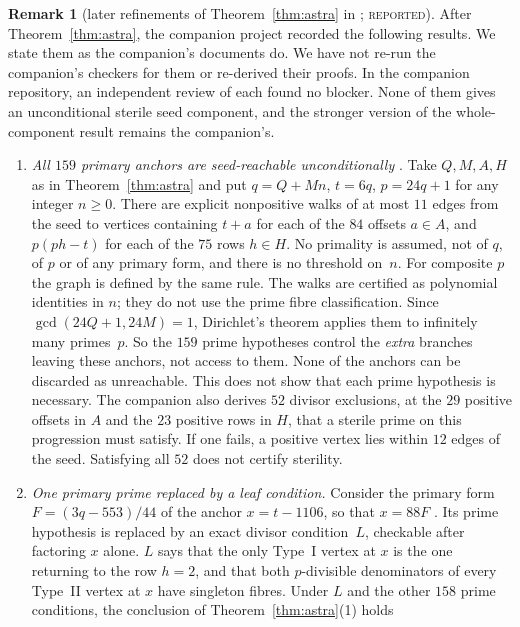 \documentclass[11pt,reqno]{amsart}
\theoremstyle{definition}
\newtheorem{remark}[theorem]{Remark}
\newcommand{\status}[1]{\textsc{#1}}
\begin{document}
\begin{remark}[later refinements of Theorem~\ref{thm:astra} in \cite{AS}; \status{reported}]\label{rem:astralater}
After Theorem~\ref{thm:astra}, the companion project recorded the
following results.  We state them as the companion's documents do.  We have
not re-run the companion's checkers for them or re-derived their proofs.
In the companion repository, an independent review of each found no
blocker.  None of them gives an unconditional sterile seed component, and
the stronger version of the whole-component result remains the
companion's.
\begin{enumerate}
\item \emph{All $159$ primary anchors are seed-reachable unconditionally}
\cite[\allowbreak\texttt{PRIMARY\_REACHABILITY.md}]{AS}.  Take $Q,M,A,H$ as in
Theorem~\ref{thm:astra} and put $q=Q+Mn$, $t=6q$, $p=24q+1$ for any integer
$n\ge0$.  There are explicit nonpositive walks of at most $11$ edges from
the seed to vertices containing $t+a$ for each of the $84$ offsets $a\in A$,
and $p(ph-t)$ for each of the $75$ rows $h\in H$.  No primality is assumed,
not of $q$, of $p$ or of any primary form, and there is no threshold on~$n$.
For composite $p$ the graph is defined by the same rule.  The walks are
certified as polynomial identities in $n$; they do not use the prime
fibre classification.  Since $\gcd(24Q+1,24M)=1$, Dirichlet's theorem
applies them to infinitely many primes~$p$.  So the $159$ prime hypotheses
control the \emph{extra} branches leaving these anchors, not access to
them.  None of the anchors can be discarded as unreachable.  This does not
show that each prime hypothesis is necessary.  The companion also derives
$52$ divisor exclusions, at the $29$ positive offsets in $A$ and the $23$
positive rows in $H$, that a sterile prime on this progression must
satisfy.  If one fails, a positive vertex lies within $12$ edges of the
seed.  Satisfying all $52$ does not certify sterility.
\item \emph{One primary prime replaced by a leaf condition.}  Consider the
primary form $F=(3q-553)/44$ of the anchor $x=t-1106$, so that $x=88F$
\cite[\texttt{PRIMARY\_LEAF\_RELAXATION.md}]{AS}.  Its prime
hypothesis is replaced by an exact divisor condition~$L$, checkable after
factoring $x$ alone.  $L$ says that the only Type~I vertex at $x$ is the
one returning to the row $h=2$, and that both $p$-divisible denominators of
every Type~II vertex at $x$ have singleton fibres.  Under $L$ and the other
$158$ prime conditions, the conclusion of Theorem~\ref{thm:astra}(1) holds

\end{enumerate}
\end{remark}
\end{document}
